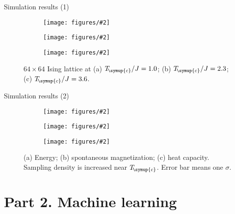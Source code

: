 \documentclass[aspectratio=169]{beamer}
\def\Tc{T_{\!\symup{c}}}
\newcommand\imageinput[2][]{\texttt{[image: figures/\#2]}}
\begin{document}
\begin{frame}{Simulation results (1)}
\begin{figure}
  \centering
  \begin{subfigure}[b]{0.32\textwidth}
    \centering
    \imageinput[width=3cm]{ising-lattice-1-0.pdf}
    \caption{}
  \end{subfigure}
  \begin{subfigure}[b]{0.32\textwidth}
    \centering
    \imageinput[width=3cm]{ising-lattice-2-3.pdf}
    \caption{}
  \end{subfigure}
  \begin{subfigure}[b]{0.32\textwidth}
    \centering
    \imageinput[width=3cm]{ising-lattice-3-6.pdf}
    \caption{}
  \end{subfigure}
  \caption{$64 \times 64$ Ising lattice at (a) $\Tc/J=1.0$; (b) $\Tc/J=2.3$; (c) $\Tc/J=3.6$.}
\end{figure}
\end{frame}

\begin{frame}{Simulation results (2)}
\begin{figure}
  \centering
  \begin{subfigure}[b]{0.32\textwidth}
    \centering
    \imageinput[height=3.4cm]{ising-energy.pdf}
  \end{subfigure}
  \begin{subfigure}[b]{0.32\textwidth}
    \centering
    \imageinput[height=3.4cm]{ising-magnet.pdf}
  \end{subfigure}
  \begin{subfigure}[b]{0.32\textwidth}
    \centering
    \imageinput[height=3.4cm]{ising-cv.pdf}
  \end{subfigure}
  \caption{(a) Energy; (b) spontaneous magnetization; (c) heat capacity.
    Sampling density is increased near $\Tc$. Error bar means one $\sigma$.}
\end{figure}
\end{frame}

\section{Part 2. Machine learning}
\end{document}
